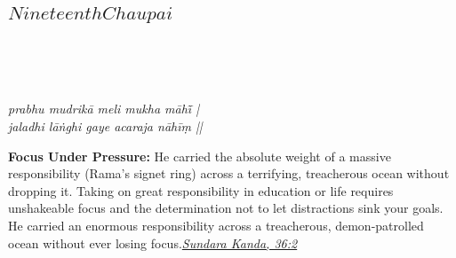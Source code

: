 
\newpage

\subsection*{ \(Nineteenth Chaupai\)}

\begin{minipage}[t]{0.55\textwidth}
\vspace{0pt}

{\large \linespread{1.5}\selectfont
{}\\
\par}

\vspace{0.5em}

{\large \linespread{1.5}\selectfont
{}\\
\par}

\vspace{0.5em}

{\large \linespread{1.3}\selectfont
\textit{prabhu mudrikā meli mukha māhī̃ |}\\
\textit{jaladhi lāṅghi gaye acaraja nāhīṃ ||}
\par}
\end{minipage}%
\hfill
\begin{minipage}[t]{0.42\textwidth}
\vspace{0pt}
\begin{tcolorbox}[anchorbox]
\textbf{Focus Under Pressure:} He carried the absolute weight of a massive responsibility (Rama's signet ring) across a terrifying, treacherous ocean without dropping it. Taking on great responsibility in education or life requires unshakeable focus and the determination not to let distractions sink your goals.
\vspace{0.5em}\newline He carried an enormous responsibility across a treacherous, demon-patrolled ocean without ever losing focus.\newline\null\hfill\href{https://www.valmiki.iitk.ac.in/sloka?field_kanda_tid=5&language=dv&field_sarga_value=36}{\textit{Sundara Kanda, 36:2}}
\end{tcolorbox}
\end{minipage}

